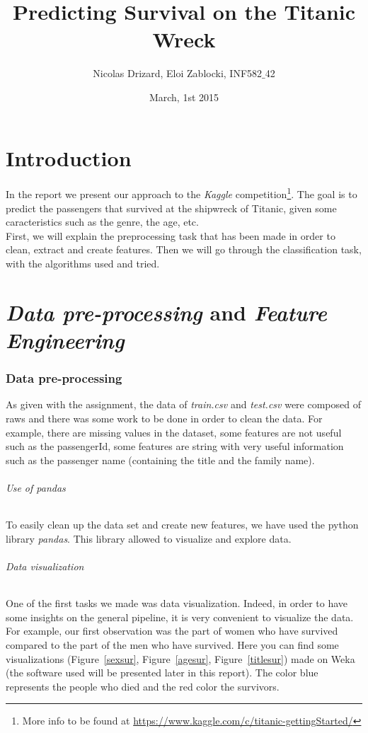 \documentclass[11pt,a4paper,portrait]{article}
\author{Nicolas Drizard, Eloi Zablocki, INF582$\_$42}
\date{March, 1st 2015}
\title{Predicting Survival on the Titanic Wreck}
\begin{document}
\maketitle


\newpage
\part*{Introduction}
In the report we present our approach to the \textit{Kaggle} competition\footnote{More info to be found at \url{https://www.kaggle.com/c/titanic-gettingStarted/}}. The goal is to predict the passengers that survived at the shipwreck of Titanic, given some caracteristics such as the genre, the age, etc.\\
First, we will explain the preprocessing task that has been made in order to clean, extract and create features. Then we will go through the classification task, with the algorithms used and tried.

\part{\textit{Data pre-processing} and \textit{Feature Engineering}}
\setcounter{section}{0}


\section{Data pre-processing}
As given with the assignment, the data of \textit{train.csv} and \textit{test.csv} were composed of raws and there was some work to be done in order to clean the data. For example, there are missing values in the dataset, some features are not useful such as the passengerId, some features are string with very useful information such as the passenger name (containing the title and the family name).

\paragraph{Use of pandas}
To easily clean up the data set and create new features, we have used the python library \textit{pandas}. This library allowed to visualize and explore data.

\paragraph{Data visualization}
One of the first tasks we made was data visualization. Indeed, in order to have some insights on the general pipeline, it is very convenient to visualize the data. For example, our first observation was the part of women who have survived compared to the part of the men who have survived. Here you can find some visualizations (Figure~\ref{sexsur}, Figure~\ref{agesur}, Figure~\ref{titlesur}) made on Weka (the software used will be presented later in this report). The color blue represents the people who died and the red color the survivors.
\end{document}
